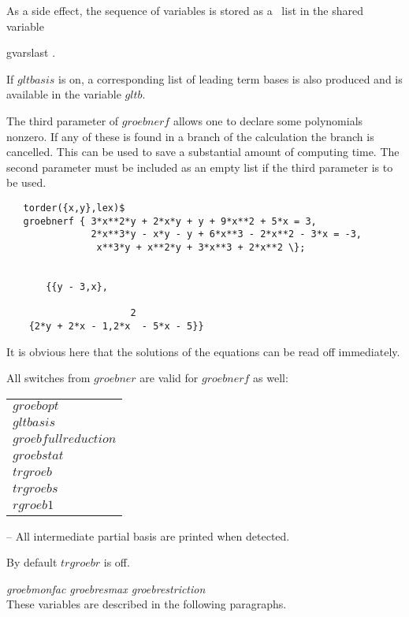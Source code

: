 As a side effect, the sequence of variables is stored as a \REDUCE \  list in
the shared variable
\begin{center}
gvarslast .
\end{center}
If $gltbasis$ is on, a corresponding list of leading term bases is
also produced and is available in the variable $gltb$.

The third parameter of $groebnerf$ allows one to declare some polynomials
nonzero. If any of these is found in a branch of the calculation
the branch is cancelled. This can be used to save a substantial amount
of computing time. The second parameter must be included as an
empty list if the third parameter is to be used.

\begin{verbatim}
   torder({x,y},lex)$
   groebnerf { 3*x**2*y + 2*x*y + y + 9*x**2 + 5*x = 3,
               2*x**3*y - x*y - y + 6*x**3 - 2*x**2 - 3*x = -3,
                x**3*y + x**2*y + 3*x**3 + 2*x**2 \};


       {{y - 3,x},

                      2
    {2*y + 2*x - 1,2*x  - 5*x - 5}}
\end{verbatim}

It is obvious here that the solutions of the equations can be read
off immediately.

All switches from $groebner$ are valid for $groebnerf$ as well:
  
  
 
\begin{center}
\begin{tabular}{l}
$groebopt$ \\
$gltbasis$ \\
$groebfullreduction$ \\
$groebstat$ \\
$trgroeb$ \\
$trgroebs$ \\
$rgroeb1$
\end{tabular}
\end{center}

\begin{description}

\item[$trgroebr$] -- All intermediate partial basis are printed when
detected.

By default $trgroebr$ is off.
\end{description}
{\it groebmonfac  groebresmax  groebrestriction} \\
\hspace*{.5cm} These variables are described in the following
paragraphs.

